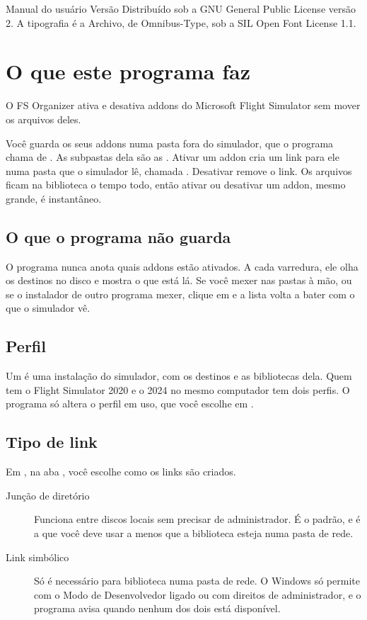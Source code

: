 \documentclass[11pt,a4paper]{article}
\begin{document}
\frenchspacing

\fsorgtitle
  {Manual do usuário}
  {Versão }
  {Distribuído sob a GNU General Public License versão 2.}
  {A tipografia é a Archivo, de Omnibus-Type, sob a SIL Open Font License 1.1.}

\thispagestyle{empty}
\tableofcontents

\section{O que este programa faz}

O FS Organizer ativa e desativa addons do Microsoft Flight Simulator sem mover
os arquivos deles.

Você guarda os seus addons numa pasta fora do simulador, que o programa chama de
. As subpastas dela são as . Ativar um addon cria
um link para ele numa pasta que o simulador lê, chamada . Desativar
remove o link. Os arquivos ficam na biblioteca o tempo todo, então ativar ou
desativar um addon, mesmo grande, é instantâneo.

\subsection{O que o programa não guarda}

O programa nunca anota quais addons estão ativados. A cada varredura, ele olha
os destinos no disco e mostra o que está lá. Se você mexer nas pastas à mão, ou
se o instalador de outro programa mexer, clique em  e a lista
volta a bater com o que o simulador vê.

\subsection{Perfil}

Um  é uma instalação do simulador, com os destinos e as bibliotecas
dela. Quem tem o Flight Simulator 2020 e o 2024 no mesmo computador tem dois
perfis. O programa só altera o perfil em uso, que você escolhe em .

\subsection{Tipo de link}

Em , na aba , você escolhe como os links são criados.

\begin{description}
  \item[Junção de diretório] Funciona entre discos locais sem precisar de
    administrador. É o padrão, e é a que você deve usar a menos que a biblioteca
    esteja numa pasta de rede.
  \item[Link simbólico] Só é necessário para biblioteca numa pasta de rede. O
    Windows só permite com o Modo de Desenvolvedor ligado ou com direitos de
    administrador, e o programa avisa quando nenhum dos dois está disponível.
\end{description}
\end{document}
